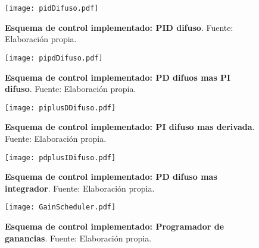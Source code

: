    \vfill

    \begin{figure}[htb]
        \centering
        \texttt{[image: pidDifuso.pdf]}
        \caption[Esquema de control implementado: PID difuso]{\textbf{Esquema de control implementado: PID difuso}. Fuente: Elaboración propia.} 
        \label{fig:pidDifuso}
    \end{figure}
    
    \vfill

    \pagebreak
    
    \vfill

    \begin{figure}[htb]
        \centering
        \texttt{[image: pipdDifuso.pdf]}
        \caption[Esquema de control implementado: PD difuos mas PI difuso]{\textbf{Esquema de control implementado: PD difuos mas PI difuso}. Fuente: Elaboración propia.} 
        \label{fig:pipdDifuso}
    \end{figure}
    
    \vfill

    \begin{figure}[htb]
        \centering
        \texttt{[image: piplusDDifuso.pdf]}
        \caption[Esquema de control implementado: PI difuso mas derivada]{\textbf{Esquema de control implementado: PI difuso mas derivada}. Fuente: Elaboración propia.} 
        \label{fig:piplusDDifuso}
    \end{figure}
    
    \vfill

    \begin{figure}[htb]
        \centering
        \texttt{[image: pdplusIDifuso.pdf]}
        \caption[Esquema de control implementado: PD difuso mas integrador]{\textbf{Esquema de control implementado: PD difuso mas integrador}. Fuente: Elaboración propia.} 
        \label{fig:pdplusIDifuso}
    \end{figure}
    
    \vfill

    \pagebreak
    
    \vfill

    \begin{figure}[htb]
        \centering
        \texttt{[image: GainScheduler.pdf]}
        \caption[Esquema de control implementado: Programador de ganancias]{\textbf{Esquema de control implementado: Programador de ganancias}. Fuente: Elaboración propia.} 
        \label{fig:GainScheduler}
    \end{figure}
    
